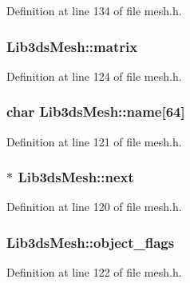 Definition at line 134 of file mesh.\-h.

\hypertarget{struct_lib3ds_mesh_ad2343eac26e3d3b0a692003db67ef2f5}{
\subsubsection[{matrix}]{ Lib3ds\-Mesh\-::matrix}}\label{struct_lib3ds_mesh_ad2343eac26e3d3b0a692003db67ef2f5}


Definition at line 124 of file mesh.\-h.

\hypertarget{struct_lib3ds_mesh_a6da27bc5e8b74b243ac241fecf5b1149}{
\subsubsection[{name}]{\setlength{\rightskip}{0pt plus 5cm}char Lib3ds\-Mesh\-::name\mbox{[}64\mbox{]}}}\label{struct_lib3ds_mesh_a6da27bc5e8b74b243ac241fecf5b1149}


Definition at line 121 of file mesh.\-h.

\hypertarget{struct_lib3ds_mesh_ab9cc0d0b74dc5a908e4c8482b9426868}{
\subsubsection[{next}]{$\ast$ Lib3ds\-Mesh\-::next}}\label{struct_lib3ds_mesh_ab9cc0d0b74dc5a908e4c8482b9426868}


Definition at line 120 of file mesh.\-h.

\hypertarget{struct_lib3ds_mesh_a1e5c4f2c31a644d3570916a98587f722}{
\subsubsection[{object\-\_\-flags}]{ Lib3ds\-Mesh\-::object\-\_\-flags}}\label{struct_lib3ds_mesh_a1e5c4f2c31a644d3570916a98587f722}


Definition at line 122 of file mesh.\-h.

